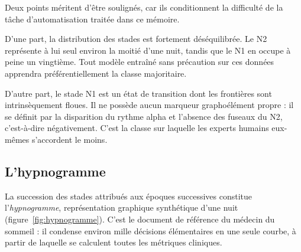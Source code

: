 Deux points méritent d'être soulignés, car ils conditionnent la difficulté de la
tâche d'automatisation traitée dans ce mémoire.

D'une part, la distribution des stades est fortement déséquilibrée. Le N2 représente
à lui seul environ la moitié d'une nuit, tandis que le N1 en occupe à peine un
vingtième. Tout modèle entraîné sans précaution sur ces données apprendra
préférentiellement la classe majoritaire.

D'autre part, le stade N1 est un état de transition dont les frontières sont
intrinsèquement floues. Il ne possède aucun marqueur graphoélément propre : il se
définit par la disparition du rythme alpha et l'absence des fuseaux du N2, c'est-à-dire
négativement. C'est la classe sur laquelle les experts humains eux-mêmes s'accordent
le moins.

\subsection{L'hypnogramme}

La succession des stades attribués aux époques successives constitue
l'\emph{hypnogramme}, représentation graphique synthétique d'une nuit
(figure~\ref{fig:hypnogramme}). C'est le document de référence du médecin du sommeil :
il condense environ mille décisions élémentaires en une seule courbe, à partir de
laquelle se calculent toutes les métriques cliniques.

